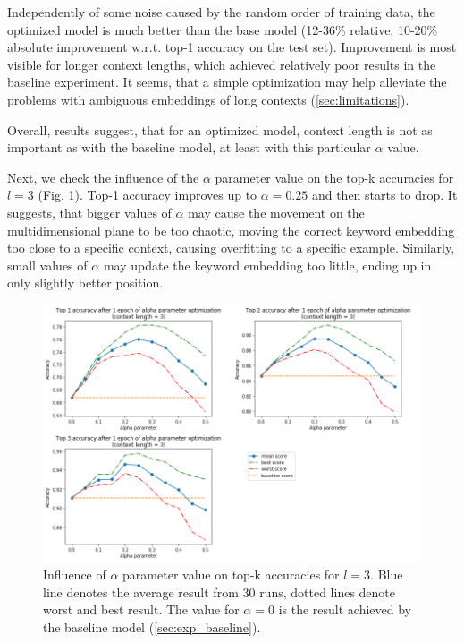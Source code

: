 \documentclass{llncs}
\begin{document}
Independently of some noise caused by the random order of training data, the optimized model is much better than the base model (12-36\% relative, 10-20\% absolute improvement w.r.t. top-1 accuracy on the test set).
Improvement is most visible for longer context lengths, which achieved relatively poor results in the baseline experiment.
It seems, that a simple optimization may help alleviate the problems with ambiguous embeddings of long contexts (\ref{sec:limitations}).

Overall, results suggest, that for an optimized model, context length is not as important as with the baseline model, at least with this particular \(\alpha\) value.

Next, we check the influence of the \(\alpha\) parameter value on the top-k accuracies for \(l=3\) (Fig. \ref{fig:exp2_alpha}).
Top-1 accuracy improves up to \(\alpha=0.25\) and then starts to drop.
It suggests, that bigger values of \(\alpha\) may cause the movement on the multidimensional plane to be too chaotic, moving the correct keyword embedding too close to a specific context, causing overfitting to a specific example.
Similarly, small values of \(\alpha\) may update the keyword embedding too little, ending up in only slightly better position.

\begin{figure}
    \centering
    \caption{Influence of \(\alpha\) parameter value on top-k accuracies for \(l=3\). Blue line denotes the average result from 30 runs, dotted lines denote worst and best result. The value for \(\alpha=0\) is the result achieved by the baseline model (\ref{sec:exp_baseline}).}
    \label{fig:exp2_alpha}
    \includegraphics[scale=0.65]{res/exp2_alpha_top_acc.png}
\end{figure}
\end{document}
